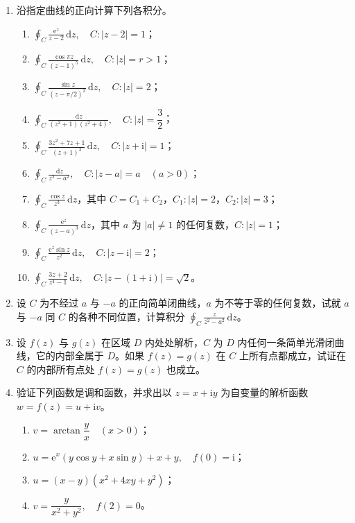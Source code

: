 \documentclass[UTF8,11pt,a4paper]{ctexart}
\newcommand{\dd}{\,\mathrm{d}}
\newcommand{\ee}{\mathrm{e}}
\newcommand{\ii}{\mathrm{i}}
\begin{document}
\begin{enumerate}
\item 沿指定曲线的正向计算下列各积分。
  \begin{enumerate}
  \item $\displaystyle\oint_C\frac{\ee^z}{z-2}\dd z,\quad C:|z-2|=1$；
  \item $\displaystyle\oint_C\frac{\cos\pi z}{(z-1)^5}\dd z,\quad C:|z|=r>1$；
  \item $\displaystyle\oint_C\frac{\sin z}{(z-\pi/2)^2}\dd z,\quad C:|z|=2$；
  \item $\displaystyle\oint_C\frac{\dd z}{(z^2+1)(z^2+4)},\quad C:|z|=\dfrac32$；
  \item $\displaystyle\oint_C\frac{3z^2+7z+1}{(z+1)^3}\dd z,\quad C:|z+\ii|=1$；
  \item $\displaystyle\oint_C\frac{\dd z}{z^2-a^2},\quad C:|z-a|=a\quad(a>0)$；
  \item $\displaystyle\oint_C\frac{\cos z}{z^3}\dd z$，其中 $C=C_1+C_2$，$C_1:|z|=2$，$C_2:|z|=3$；
  \item $\displaystyle\oint_C\frac{\ee^z}{(z-a)^3}\dd z$，其中 $a$ 为 $|a|\ne1$ 的任何复数，$C:|z|=1$；
  \item $\displaystyle\oint_C\frac{\ee^z\sin z}{z^2}\dd z,\quad C:|z-\ii|=2$；
  \item $\displaystyle\oint_C\frac{3z+2}{z^4-1}\dd z,\quad C:|z-(1+\ii)|=\sqrt2$。
  \end{enumerate}

\item 设 $C$ 为不经过 $a$ 与 $-a$ 的正向简单闭曲线，$a$ 为不等于零的任何复数，试就 $a$ 与 $-a$ 同 $C$ 的各种不同位置，计算积分
$\displaystyle\oint_C\frac{z}{z^2-a^2}\dd z$。

\item 设 $f(z)$ 与 $g(z)$ 在区域 $D$ 内处处解析，$C$ 为 $D$ 内任何一条简单光滑闭曲线，它的内部全属于 $D$。如果 $f(z)=g(z)$ 在 $C$ 上所有点都成立，试证在 $C$ 的内部所有点处 $f(z)=g(z)$ 也成立。

\item 验证下列函数是调和函数，并求出以 $z=x+\ii y$ 为自变量的解析函数 $w=f(z)=u+\ii v$。
  \begin{enumerate}
  \item $v=\arctan\dfrac yx\quad(x>0)$；
  \item $u=\ee^x(y\cos y+x\sin y)+x+y,\quad f(0)=\ii$；
  \item $u=(x-y)(x^2+4xy+y^2)$；
  \item $v=\dfrac{y}{x^2+y^2},\quad f(2)=0$。
  \end{enumerate}


\end{enumerate}
\end{document}
